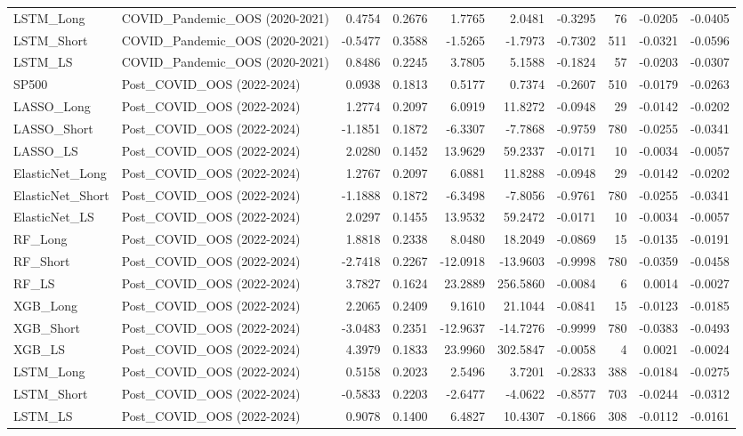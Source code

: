 \begin{tabular}{llrrrrrrrr}
\cline{1-10}
LSTM\_Long & COVID\_Pandemic\_OOS (2020-2021) & 0.4754 & 0.2676 & 1.7765 & 2.0481 & -0.3295 & 76 & -0.0205 & -0.0405 \\
\cline{1-10}
LSTM\_Short & COVID\_Pandemic\_OOS (2020-2021) & -0.5477 & 0.3588 & -1.5265 & -1.7973 & -0.7302 & 511 & -0.0321 & -0.0596 \\
\cline{1-10}
LSTM\_LS & COVID\_Pandemic\_OOS (2020-2021) & 0.8486 & 0.2245 & 3.7805 & 5.1588 & -0.1824 & 57 & -0.0203 & -0.0307 \\
\cline{1-10}
SP500 & Post\_COVID\_OOS (2022-2024) & 0.0938 & 0.1813 & 0.5177 & 0.7374 & -0.2607 & 510 & -0.0179 & -0.0263 \\
\cline{1-10}
LASSO\_Long & Post\_COVID\_OOS (2022-2024) & 1.2774 & 0.2097 & 6.0919 & 11.8272 & -0.0948 & 29 & -0.0142 & -0.0202 \\
\cline{1-10}
LASSO\_Short & Post\_COVID\_OOS (2022-2024) & -1.1851 & 0.1872 & -6.3307 & -7.7868 & -0.9759 & 780 & -0.0255 & -0.0341 \\
\cline{1-10}
LASSO\_LS & Post\_COVID\_OOS (2022-2024) & 2.0280 & 0.1452 & 13.9629 & 59.2337 & -0.0171 & 10 & -0.0034 & -0.0057 \\
\cline{1-10}
ElasticNet\_Long & Post\_COVID\_OOS (2022-2024) & 1.2767 & 0.2097 & 6.0881 & 11.8288 & -0.0948 & 29 & -0.0142 & -0.0202 \\
\cline{1-10}
ElasticNet\_Short & Post\_COVID\_OOS (2022-2024) & -1.1888 & 0.1872 & -6.3498 & -7.8056 & -0.9761 & 780 & -0.0255 & -0.0341 \\
\cline{1-10}
ElasticNet\_LS & Post\_COVID\_OOS (2022-2024) & 2.0297 & 0.1455 & 13.9532 & 59.2472 & -0.0171 & 10 & -0.0034 & -0.0057 \\
\cline{1-10}
RF\_Long & Post\_COVID\_OOS (2022-2024) & 1.8818 & 0.2338 & 8.0480 & 18.2049 & -0.0869 & 15 & -0.0135 & -0.0191 \\
\cline{1-10}
RF\_Short & Post\_COVID\_OOS (2022-2024) & -2.7418 & 0.2267 & -12.0918 & -13.9603 & -0.9998 & 780 & -0.0359 & -0.0458 \\
\cline{1-10}
RF\_LS & Post\_COVID\_OOS (2022-2024) & 3.7827 & 0.1624 & 23.2889 & 256.5860 & -0.0084 & 6 & 0.0014 & -0.0027 \\
\cline{1-10}
XGB\_Long & Post\_COVID\_OOS (2022-2024) & 2.2065 & 0.2409 & 9.1610 & 21.1044 & -0.0841 & 15 & -0.0123 & -0.0185 \\
\cline{1-10}
XGB\_Short & Post\_COVID\_OOS (2022-2024) & -3.0483 & 0.2351 & -12.9637 & -14.7276 & -0.9999 & 780 & -0.0383 & -0.0493 \\
\cline{1-10}
XGB\_LS & Post\_COVID\_OOS (2022-2024) & 4.3979 & 0.1833 & 23.9960 & 302.5847 & -0.0058 & 4 & 0.0021 & -0.0024 \\
\cline{1-10}
LSTM\_Long & Post\_COVID\_OOS (2022-2024) & 0.5158 & 0.2023 & 2.5496 & 3.7201 & -0.2833 & 388 & -0.0184 & -0.0275 \\
\cline{1-10}
LSTM\_Short & Post\_COVID\_OOS (2022-2024) & -0.5833 & 0.2203 & -2.6477 & -4.0622 & -0.8577 & 703 & -0.0244 & -0.0312 \\
\cline{1-10}
LSTM\_LS & Post\_COVID\_OOS (2022-2024) & 0.9078 & 0.1400 & 6.4827 & 10.4307 & -0.1866 & 308 & -0.0112 & -0.0161 \\
\cline{1-10}
\bottomrule
\end{tabular}
